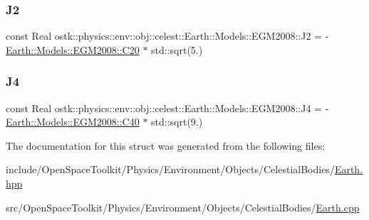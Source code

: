 \mbox{\label{structostk_1_1physics_1_1env_1_1obj_1_1celest_1_1_earth_1_1_models_1_1_e_g_m2008_a997d91f4530dc39664b7795868754382}} 
\subsubsection{\texorpdfstring{J2}{J2}}
{\footnotesize\ttfamily const Real ostk\+::physics\+::env\+::obj\+::celest\+::\+Earth\+::\+Models\+::\+E\+G\+M2008\+::\+J2 = -\/\hyperlink{structostk_1_1physics_1_1env_1_1obj_1_1celest_1_1_earth_1_1_models_1_1_e_g_m2008_a0f6ab7acf82079be89804e6b0eb28482}{Earth\+::\+Models\+::\+E\+G\+M2008\+::\+C20} $\ast$ std\+::sqrt(5.)\hspace{0.3cm}{\ttfamily [static]}}

\mbox{\label{structostk_1_1physics_1_1env_1_1obj_1_1celest_1_1_earth_1_1_models_1_1_e_g_m2008_a8baff2cdb9ed283e36a67a393870e2d8}} 
\subsubsection{\texorpdfstring{J4}{J4}}
{\footnotesize\ttfamily const Real ostk\+::physics\+::env\+::obj\+::celest\+::\+Earth\+::\+Models\+::\+E\+G\+M2008\+::\+J4 = -\/\hyperlink{structostk_1_1physics_1_1env_1_1obj_1_1celest_1_1_earth_1_1_models_1_1_e_g_m2008_ac5e96adc83d88ad825d4392dc37d7dc7}{Earth\+::\+Models\+::\+E\+G\+M2008\+::\+C40} $\ast$ std\+::sqrt(9.)\hspace{0.3cm}{\ttfamily [static]}}



The documentation for this struct was generated from the following files\+:\begin{DoxyCompactItemize}
\item 
include/\+Open\+Space\+Toolkit/\+Physics/\+Environment/\+Objects/\+Celestial\+Bodies/\hyperlink{_objects_2_celestial_bodies_2_earth_8hpp}{Earth.\+hpp}\item 
src/\+Open\+Space\+Toolkit/\+Physics/\+Environment/\+Objects/\+Celestial\+Bodies/\hyperlink{_objects_2_celestial_bodies_2_earth_8cpp}{Earth.\+cpp}\end{DoxyCompactItemize}

